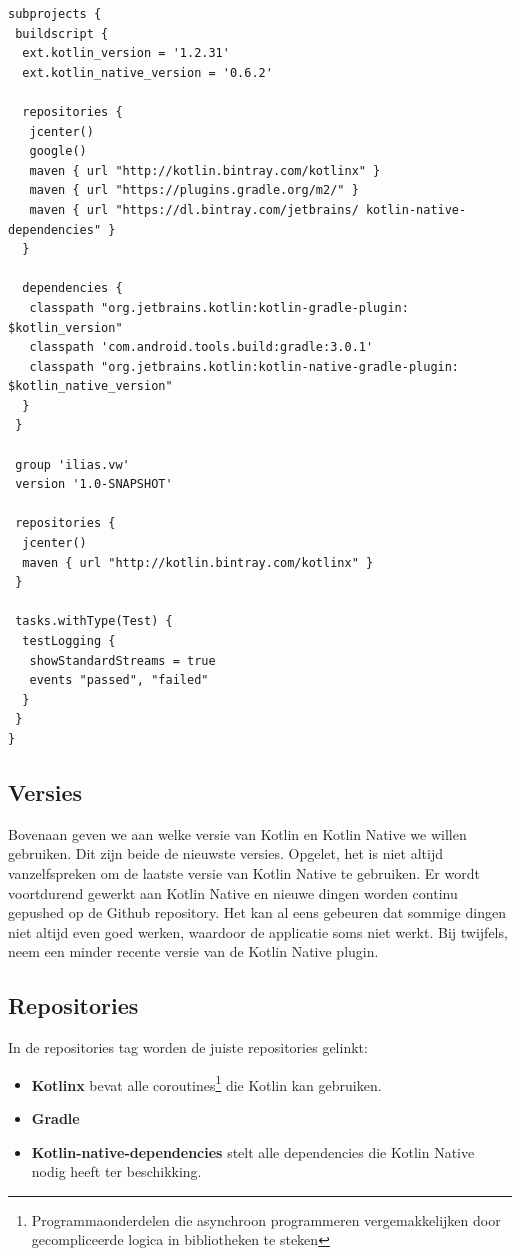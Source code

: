 \begin{lstlisting}
subprojects {
 buildscript {
  ext.kotlin_version = '1.2.31'
  ext.kotlin_native_version = '0.6.2'
		
  repositories {
   jcenter()
   google()
   maven { url "http://kotlin.bintray.com/kotlinx" }
   maven { url "https://plugins.gradle.org/m2/" }
   maven { url "https://dl.bintray.com/jetbrains/ kotlin-native-dependencies" }
  }

  dependencies {
   classpath "org.jetbrains.kotlin:kotlin-gradle-plugin: $kotlin_version"
   classpath 'com.android.tools.build:gradle:3.0.1'
   classpath "org.jetbrains.kotlin:kotlin-native-gradle-plugin: $kotlin_native_version"
  }
 }
	
 group 'ilias.vw'
 version '1.0-SNAPSHOT'
	
 repositories {
  jcenter()
  maven { url "http://kotlin.bintray.com/kotlinx" }
 }
	
 tasks.withType(Test) {
  testLogging {
   showStandardStreams = true
   events "passed", "failed"
  }
 }
}
\end{lstlisting}
\subsection{Versies}
Bovenaan geven we aan welke versie van Kotlin en Kotlin Native we willen gebruiken. Dit zijn beide de nieuwste versies. Opgelet, het is niet altijd vanzelfspreken om de laatste versie van Kotlin Native te gebruiken. Er wordt voortdurend gewerkt aan Kotlin Native en nieuwe dingen worden continu gepushed op de Github repository. Het kan al eens gebeuren dat sommige dingen niet altijd even goed werken, waardoor de applicatie soms niet werkt. Bij twijfels, neem een minder recente versie van de Kotlin Native plugin.

\subsection{Repositories}
In de repositories tag worden de juiste repositories gelinkt:
\begin{itemize}
	\item \textbf{Kotlinx} bevat alle coroutines\footnote{Programmaonderdelen die asynchroon programmeren vergemakkelijken door gecompliceerde logica in bibliotheken te steken} die Kotlin kan gebruiken.
	\item \textbf{Gradle}
	\item \textbf{Kotlin-native-dependencies} stelt alle dependencies die Kotlin Native nodig heeft ter beschikking.
\end{itemize}

